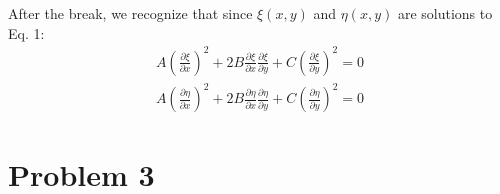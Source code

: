 \documentclass[a4paper,10pt]{article}
\begin{document}
After the break, we recognize that since $\xi(x,y)$ and $\eta(x,y)$ are solutions to Eq. 1:
\begin{gather}
 A(\frac{\partial \xi}{\partial x})^2+2B\frac{\partial \xi}{\partial x}\frac{\partial \xi}{ \partial y}+C(\frac{\partial \xi}{\partial y})^2=0\\
 A(\frac{\partial \eta}{\partial x})^2+2B\frac{\partial \eta}{\partial x}\frac{\partial \eta}{ \partial y}+C(\frac{\partial \eta}{\partial y})^2=0
\end{gather}



\section{Problem 3}
\end{document}
